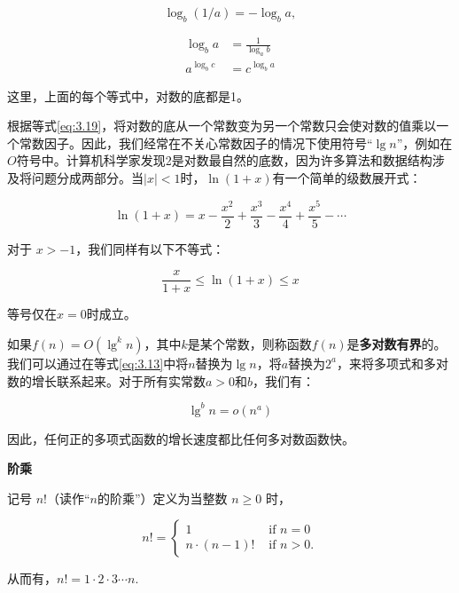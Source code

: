 \documentclass[lang=cn,newtx,10pt,scheme=chinese]{elegantbook}
\begin{document}
\begin{equation}\label{eq:3.20}
\log _b(1 / a)=-\log _b a,
\end{equation}

\begin{equation}\label{eq:3.21}
\begin{aligned}
\log _b a &= \frac{1}{\log _a b} \\
a^{\log _b c} &= c^{\log _b a}
\end{aligned}
\end{equation}

这里，上面的每个等式中，对数的底都是1。

根据等式\eqref{eq:3.19}，将对数的底从一个常数变为另一个常数只会使对数的值乘以一个常数因子。因此，我们经常在不关心常数因子的情况下使用符号“$\lg n$”，例如在$O$符号中。计算机科学家发现2是对数最自然的底数，因为许多算法和数据结构涉及将问题分成两部分。当$|x|<1$时，$\ln (1+x)$有一个简单的级数展开式：

\begin{equation}\label{eq:3.22}
\ln (1+x)=x-\frac{x^2}{2}+\frac{x^3}{3}-\frac{x^4}{4}+\frac{x^5}{5}-\cdots
\end{equation}

对于 $x>-1$，我们同样有以下不等式：

\begin{equation}\label{eq:3.23}
\frac{x}{1+x} \leq \ln (1+x) \leq x
\end{equation}

等号仅在$x=0$时成立。

如果$f(n)=O\left(\lg ^k n\right)$，其中$k$是某个常数，则称函数$f(n)$是\textbf{多对数有界}的。我们可以通过在等式\eqref{eq:3.13}中将$n$替换为$\lg n$，将$a$替换为$2^a$，来将多项式和多对数的增长联系起来。对于所有实常数$a>0$和$b$，我们有：

\begin{equation}\label{eq:3.24}
\lg ^b n=o\left(n^a\right)
\end{equation}

因此，任何正的多项式函数的增长速度都比任何多对数函数快。

\textbf{阶乘}

记号 $n!$（读作``$n$的阶乘''）定义为当整数 $n \geq 0$ 时，

$$
n != \begin{cases}1 & \text { if } n=0 \\ n \cdot(n-1) ! & \text { if } n>0 .\end{cases}
$$

从而有，$n !=1 \cdot 2 \cdot 3 \cdots n$.
\end{document}
